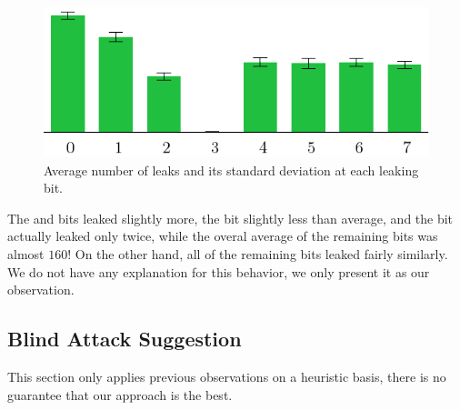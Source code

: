 	\begin{figure}[h]
	\begin{center}
		\includegraphics{figures/leak_bit/leak_bit.pdf}
		\caption{Average number of leaks and its standard deviation at each leaking bit.}
		\label{fig:leakbitall}
	\end{center}
	\end{figure}
	
	The  and  bits leaked slightly more, the  bit slightly less than average, and the  bit actually leaked only twice, while the overal average of the remaining bits was almost $160$! On the other hand, all of the remaining bits leaked fairly similarly. We do not have any explanation for this behavior, we only present it as our observation.



\subsection{Blind Attack Suggestion}
\label{sec:subblindattack}

\begin{note}
	This section only applies previous observations on a heuristic basis, there is no guarantee that our approach is the best.
\end{note}

